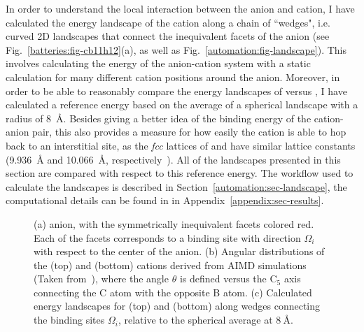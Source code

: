 \begin{refsection}

In order to understand the local interaction between the anion and cation, I have calculated the energy landscape of the cation along a chain of ``wedges", i.e. curved 2D landscapes that connect the inequivalent facets of the anion (see Fig.~\ref{batteries:fig-cb11h12}(a), as well as Fig.~\ref{automation:fig-landscape}). This involves calculating the energy of the anion-cation system with a static calculation for many different cation positions around the anion. Moreover, in order to be able to reasonably compare the energy landscapes of  versus , I have calculated a reference energy based on the average of a spherical landscape with a radius of 8~\si{\angstrom}. Besides giving a better idea of the binding energy of the cation-anion pair, this also provides a measure for how easily the cation is able to hop back to an interstitial site, as the \textit{fcc} lattices of  and  have similar lattice constants (9.936~\si{\angstrom} and 10.066~\si{\angstrom}, respectively~\cite{Tang2015}). All of the landscapes presented in this section are compared with respect to this reference energy. The workflow used to calculate the landscapes is described in Section~\ref{automation:sec-landscape}, the computational details can be found in  in Appendix~\ref{appendix:sec-results}.

{
\begin{figure}[ht]
\centering

\caption{(a) \ce{[CB11H12]^{-}} anion, with the symmetrically inequivalent facets colored red. Each of the facets corresponds to a binding site with direction $\Omega_i$ with respect to the center of the anion. (b) Angular distributions of the  (top) and  (bottom) cations derived from \gls{AIMD} simulations (Taken from~\cite{Dimitrievska2018}), where the angle $\theta$ is defined versus the C$_5$ axis connecting the C atom with the opposite B atom. (c) Calculated energy landscapes for  (top) and  (bottom) along wedges connecting the binding sites $\Omega_i$, relative to the spherical average at $8~\si{\angstrom}$.}
\end{figure}
\label{batteries:fig-cb11h12}
}


\end{refsection}
